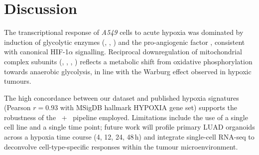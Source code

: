 \section{Discussion}

The transcriptional response of \textit{A549} cells to acute hypoxia was dominated by
induction of glycolytic enzymes (, , ) and the
pro-angiogenic factor , consistent with canonical HIF-1$\alpha$ signalling.
Reciprocal downregulation of mitochondrial complex subunits (, ,
, ) reflects a metabolic shift from oxidative phosphorylation
towards anaerobic glycolysis, in line with the Warburg effect observed in hypoxic tumours.

The high concordance between our dataset and published hypoxia signatures
(Pearson $r=0.93$ with MSigDB hallmark HYPOXIA gene set) supports the robustness
of the ~+~ pipeline employed. Limitations include the use
of a single cell line and a single time point; future work will profile primary LUAD
organoids across a hypoxia time course (4, 12, 24, 48\,h) and integrate single-cell
RNA-seq to deconvolve cell-type-specific responses within the tumour microenvironment.

